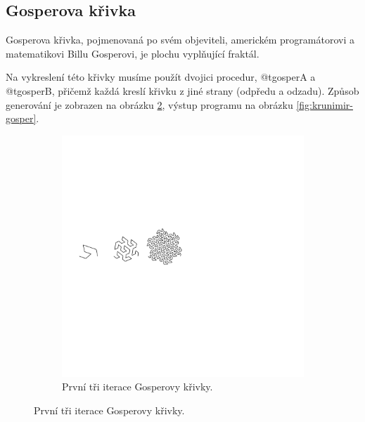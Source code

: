 \subsection{Gosperova křivka}

Gosperova křivka, pojmenovaná po svém objeviteli, americkém programátorovi a
matematikovi Billu Gosperovi, je plochu vyplňující fraktál.
\cite{wiki:gosper-curve}

Na vykreslení této křivky musíme použít dvojici procedur, @t{gosperA} a
@t{gosperB}, přičemž každá kreslí křivku z jiné strany (odpředu a odzadu).
Způsob generování je zobrazen na obrázku \ref{fig:krunimir-gosper-gen}, výstup
programu na obrázku \ref{fig:krunimir-gosper}.



\begin{figure}
  \centering
  \caption{Gosperova křivka}
  \label{fig:krunimir-gosper-all}

  \begin{subfigure}{0.8\textwidth}
    \includegraphics[width=\textwidth,trim=0 250 250 200]{krunimir/examples/gosper-gen}
    \caption{První tři iterace Gosperovy křivky.}
    \label{fig:krunimir-gosper-gen}
  \end{subfigure}


\end{figure}
